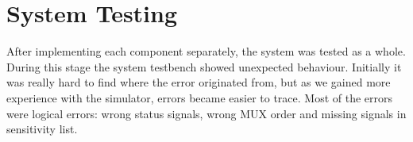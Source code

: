 \section{System Testing}
After implementing each component separately, the system was tested as a whole.
During this stage the system testbench showed unexpected behaviour.
Initially it was really hard to find where the error originated from,
but as we gained more experience with the simulator, errors became easier to trace.
Most of the errors were logical errors: wrong status signals, wrong MUX order and missing signals in sensitivity list.
